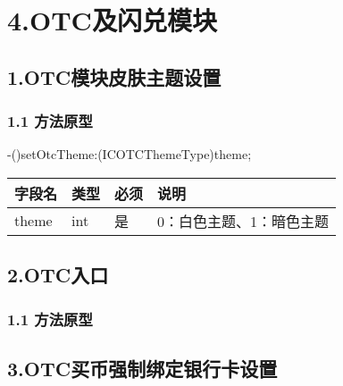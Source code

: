 \documentclass[letterpaper,10pt,english]{sphinxmanual}
\begin{document}
\section{4.OTC及闪兑模块}
\label{\detokenize{BCBWalletSDK_u63a5_u53e3_u8bf4_u660e:otc}}

\subsection{1.OTC模块皮肤主题设置}
\label{\detokenize{BCBWalletSDK_u63a5_u53e3_u8bf4_u660e:id78}}

\subsubsection{1.1 方法原型}
\label{\detokenize{BCBWalletSDK_u63a5_u53e3_u8bf4_u660e:id79}}
-()setOtcTheme:(ICOTCThemeType)theme;



\begin{savenotes}\sphinxattablestart
\centering
\begin{tabulary}{\linewidth}[t]{|T|T|T|T|}
\hline
\sphinxstyletheadfamily 
字段名
&\sphinxstyletheadfamily 
类型
&\sphinxstyletheadfamily 
必须
&\sphinxstyletheadfamily 
说明
\\
\hline
theme
&
int
&
是
&
0：白色主题、1：暗色主题
\\
\hline
\end{tabulary}
\par
\sphinxattableend\end{savenotes}


\subsection{2.OTC入口}
\label{\detokenize{BCBWalletSDK_u63a5_u53e3_u8bf4_u660e:id80}}

\subsubsection{1.1 方法原型}
\label{\detokenize{BCBWalletSDK_u63a5_u53e3_u8bf4_u660e:id81}}


\subsection{3.OTC买币强制绑定银行卡设置}
\label{\detokenize{BCBWalletSDK_u63a5_u53e3_u8bf4_u660e:id82}}
\end{document}
